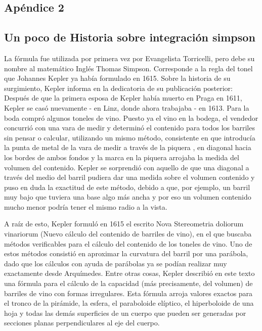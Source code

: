 \documentclass[spanish,a4paper,11pt]{report}
\begin{document}
\begin{appendix}
\chapter{Apéndice 2}
\label{appendix:2}

\section{Un poco de Historia sobre integración simpson}
\label{Apendice2:label}

La fórmula fue utilizada por primera vez por Evangelista Torricelli, pero debe su nombre al matemático Inglés Thomas Simpson. Corresponde a la regla del tonel que Johannes Kepler ya había formulado en 1615.
Sobre la historia de su surgimiento, Kepler informa en la dedicatoria de su publicación posterior: Después de que la primera esposa de Kepler había muerto en Praga en 1611, Kepler se casó nuevamente - en Linz, donde ahora trabajaba - en 1613. Para la boda compró algunos toneles de vino. Puesto ya el vino en la bodega, el vendedor concurrió con una vara de medir y determinó el contenido para todos los barriles sin pensar o calcular, utilizando un mismo método, consistente en que introducía la punta de metal de la vara de medir a través de la piquera , en diagonal hacia los bordes de ambos fondos y la marca en la piquera arrojaba la medida del volumen del contenido. Kepler se sorprendió con aquello de que una diagonal a través del medio del barril pudiera dar una medida sobre el volumen contenido y puso en duda la exactitud de este método, debido a que, por ejemplo, un barril muy bajo que tuviera una base algo más ancha y por eso un volumen contenido mucho menor podría tener el mismo radio a la vista.

\parindent=1cm A raíz de esto, Kepler formuló en 1615 el escrito Nova Stereometria doliorum vinariorum (Nuevo cálculo del contenido de barriles de vino), en el que buscaba métodos verificables para el cálculo del contenido de los toneles de vino. Uno de estos métodos consistió en aproximar la curvatura del barril por una parábola, dado que los cálculos con ayuda de parábolas ya se podían realizar muy exactamente desde Arquímedes.
Entre otras cosas, Kepler describió en este texto una fórmula para el cálculo de la capacidad (más precisamente, del volumen) de barriles de vino con formas irregulares. Esta fórmula arroja valores exactos para el tronco de la pirámide, la esfera, el paraboloide elíptico, el hiperboloide de una hoja y todas las demás superficies de un cuerpo que pueden ser generadas por secciones planas perpendiculares al eje del cuerpo.


\end{appendix}
\end{document}
